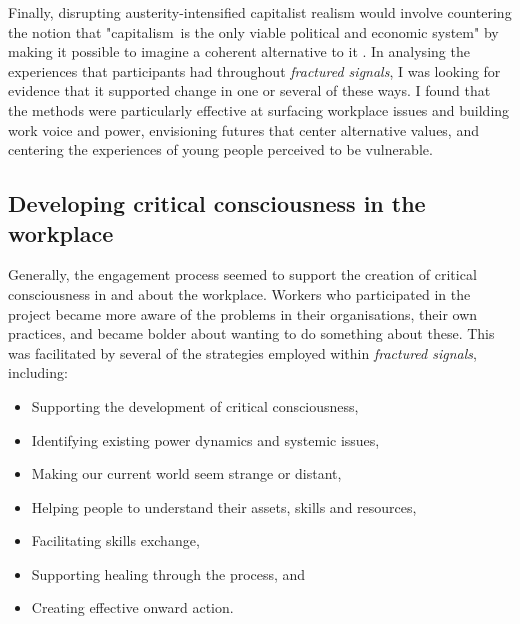Finally, disrupting austerity-intensified capitalist realism would involve countering the notion that  "capitalism is the only viable political and economic system" by making it possible to imagine a coherent alternative to it \citep{fisher_capitalist_2009}. In analysing the experiences that participants had throughout \textit{fractured signals}, I was looking for evidence that it supported change in one or several of these ways. I found that the methods were particularly effective at surfacing workplace issues and building work voice and power, envisioning futures that center alternative values, and centering the experiences of young people perceived to be vulnerable.

\subsection{Developing critical consciousness in the workplace}
Generally, the engagement process seemed to support the creation of critical consciousness in and about the workplace. Workers who participated in the project became more aware of the problems in their organisations, their own practices, and became bolder about wanting to do something about these. This was facilitated by several of the strategies employed within \textit{fractured signals}, including:
\begin{itemize}
    \item Supporting the development of critical consciousness,
    \item Identifying existing power dynamics and systemic issues,
    \item Making our current world seem strange or distant,
    \item Helping people to understand their assets, skills and resources,
    \item Facilitating skills exchange,
    \item Supporting healing through the process, and
    \item Creating effective onward action.
\end{itemize}

